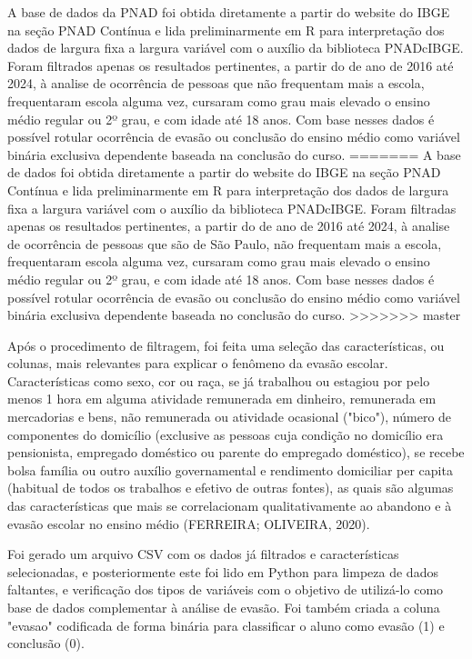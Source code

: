 \documentclass[english, spanish, brazilian]{RBIEarticle} %
\begin{document}
A base de dados da PNAD foi obtida diretamente a partir do website do IBGE na seção PNAD Contínua e lida preliminarmente em R para interpretação dos dados de largura fixa a largura variável com o auxílio da biblioteca PNADcIBGE. Foram filtrados apenas os resultados pertinentes, a partir do de ano de 2016 até 2024, à analise de ocorrência de pessoas que não frequentam mais a escola, frequentaram escola alguma vez, cursaram como grau mais elevado o ensino médio regular ou 2º grau, e com idade até 18 anos. Com base nesses dados é possível rotular ocorrência de evasão ou conclusão do ensino médio como variável binária exclusiva dependente baseada na conclusão do curso.
=======
A base de dados foi obtida diretamente a partir do website do IBGE na seção PNAD Contínua e lida preliminarmente em R para interpretação dos dados de largura fixa a largura variável com o auxílio da biblioteca PNADcIBGE. Foram filtradas apenas os resultados pertinentes, a partir do de ano de 2016 até 2024, à analise de ocorrência de pessoas que são de São Paulo, não frequentam mais a escola, frequentaram escola alguma vez, cursaram como grau mais elevado o ensino médio regular ou 2º grau, e com idade até 18 anos. Com base nesses dados é possível rotular ocorrência de evasão ou conclusão do ensino médio como variável binária exclusiva dependente baseada no conclusão do curso.
>>>>>>> master

Após o procedimento de filtragem, foi feita uma seleção das características, ou colunas, mais relevantes para explicar o fenômeno da evasão escolar. Características como sexo, cor ou raça, se já trabalhou ou estagiou por pelo menos 1 hora em alguma atividade remunerada em dinheiro, remunerada em mercadorias e bens, não remunerada ou atividade ocasional ("bico"), número de componentes do domicílio (exclusive as pessoas cuja condição no domicílio era pensionista, empregado doméstico ou parente do empregado doméstico), se recebe bolsa família ou outro auxílio governamental e rendimento domiciliar per capita
(habitual de todos os trabalhos e efetivo de outras fontes), as quais são algumas das características que mais se correlacionam qualitativamente ao abandono e à evasão escolar no ensino médio (FERREIRA; OLIVEIRA, 2020).

Foi gerado um arquivo CSV com os dados já filtrados e características selecionadas, e posteriormente este foi lido em Python para limpeza de dados faltantes, e verificação dos tipos de variáveis com o objetivo de utilizá-lo como base de dados complementar à análise de evasão. Foi também criada a coluna "evasao" codificada de forma binária para classificar o aluno como evasão (1) e conclusão (0).
\end{document}
